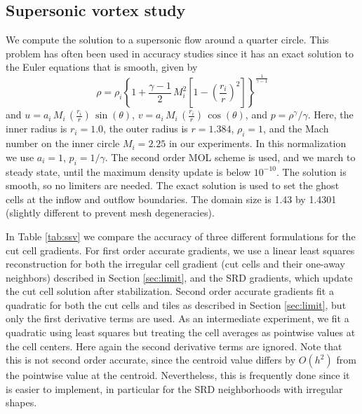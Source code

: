\subsection{Supersonic vortex study}\label{sec:ssv}
We compute the solution to a supersonic flow 
around a quarter circle.  This problem has often been used in accuracy 
studies \cite{aftosmis:acc} since it has an exact solution to the Euler
equations that is smooth, given by 
\begin{equation}
\rho = \rho_i \left \{ 1 + \frac{\gamma-1}{2} \, M_i^2 \left [ 1 - (\frac{r_i}{r})^2
\right ] \right \} ^
{\frac{1}{\gamma-1}}
\end{equation}
and $ u = a_i \, M_i \, (\frac{r_i}{r})\,  \sin (\theta)$, 
$ v = a_i\,  M_i\,  (\frac{r_i}{r})\,  \cos(\theta)$, and
$ p = \rho^\gamma / \gamma$.
Here, the inner radius is $r_i = 1.0$,  the outer radius
is $r = 1.384$, $\rho_i=1$, and the Mach number on the inner circle
$M_i = 2.25$ in our experiments. 
In this
normalization we use $a_i = 1$, $p_i = 1/\gamma$. 
The second order MOL scheme is used, and we march
to steady state, until the maximum density update is below $10^{-10}$.  
The solution is smooth, so no limiters are needed.
The exact solution is used to set the ghost cells at the inflow and
outflow boundaries. The domain size is 1.43 by 1.4301 (slightly different
to prevent mesh  degeneracies).  

In Table \ref{tab:ssv} we compare the accuracy of three different formulations
for the cut cell gradients. 
For first order accurate gradients, we use a linear least squares reconstruction for
both the irregular cell gradient (cut cells and their one-away neighbors) 
described in Section \ref{sec:limit}, and the SRD gradients, which 
update the cut cell solution after stabilization. Second order accurate 
gradients fit a quadratic for both
the cut cells and tiles as described in Section \ref{sec:limit}, 
but only the first derivative terms are used. 
As an intermediate experiment, we  fit a quadratic using least squares but treating the
cell averages as pointwise values at the cell centers. Here again
the second derivative terms are ignored.  Note that this is not
second order accurate, since the centroid value differs by $O(h^2)$
from the pointwise value at the centroid. Nevertheless, this is frequently
done since it is easier to implement, in particular for the SRD neighborhoods
with irregular shapes. 




